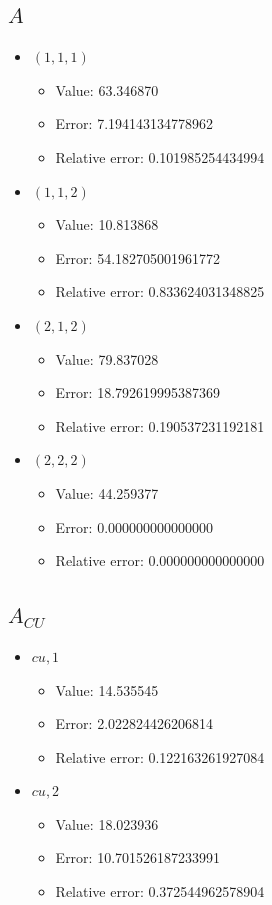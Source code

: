 \documentclass{article}%
\begin{document}
\subsection{$A$}%
\begin{itemize}%
	\item $(1, 1, 1)$%
	\begin{itemize}%
		\item Value: 63.346870%
		\item Error: 7.194143134778962%
		\item Relative error: 0.101985254434994%
	\end{itemize}%
	\item $(1, 1, 2)$%
	\begin{itemize}%
		\item Value: 10.813868%
		\item Error: 54.182705001961772%
		\item Relative error: 0.833624031348825%
	\end{itemize}%
	\item $(2, 1, 2)$%
	\begin{itemize}%
		\item Value: 79.837028%
		\item Error: 18.792619995387369%
		\item Relative error: 0.190537231192181%
	\end{itemize}%
	\item $(2, 2, 2)$%
	\begin{itemize}%
		\item Value: 44.259377%
		\item Error: 0.000000000000000%
		\item Relative error: 0.000000000000000%
	\end{itemize}%
\end{itemize}%
\subsection{$A_{CU}$}%
\begin{itemize}%
	\item $\textit{cu},1$%
	\begin{itemize}%
		\item Value: 14.535545%
		\item Error: 2.022824426206814%
		\item Relative error: 0.122163261927084%
	\end{itemize}%
	\item $\textit{cu},2$%
	\begin{itemize}%
		\item Value: 18.023936%
		\item Error: 10.701526187233991%
		\item Relative error: 0.372544962578904%
	\end{itemize}%
\end{itemize}%
\end{document}
